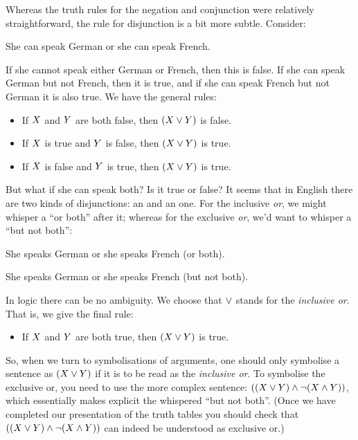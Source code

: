 Whereas the truth rules for the negation and conjunction were relatively straightforward, the rule for disjunction is a bit more subtle.
Consider:
\begin{earg}
\item[\ex{conj}] She can speak German or she can speak French.
\end{earg}
If she cannot speak either German or French, then this is false. If she can speak German but not French, then it is true, and if she can speak French but not German it is also true.
We have the general rules:
\begin{itemize}
\item If $X$ and $Y$ are both false, then $(X\vee Y)$ is false.
\item  If $X$ is true and $Y$ is false, then $(X\vee Y)$ is true.
\item  If $X$ is false and $Y$ is true, then $(X\vee Y)$ is true.
\end{itemize}

But what if she can speak both? Is it true or false?
It seems that in English there are two kinds of disjunctions: an  and an  one. For the inclusive \emph{or}, we might whisper a ``or both'' after it; whereas for the exclusive \emph{or}, we'd want to whisper a ``but not both'':
\begin{earg}
\item [\ex{inclor}] She speaks German or
she speaks French (or both).
\item [\ex{exclor}] She speaks German or
she speaks French (but not both).
\end{earg}

In logic there can be no ambiguity. We choose that $\vee$ stands for the \emph{inclusive or}.
That is, we give the final rule:
\begin{itemize}
\item If $X$ and $Y$ are both true, then $(X\vee Y)$ is true.
\end{itemize}

So, when we turn to symbolisations of arguments, one should only symbolise a sentence as $(X\vee Y)$ if it is to be read as the \emph{inclusive or}. To symbolise the exclusive or, you need to use the more complex sentence: $((X\vee Y)\mathbin{\wedge} \neg(X\mathbin{\wedge}Y))$, which essentially makes explicit the whispered ``but not both''. (Once we have completed our presentation of the truth tables you should check that $((X\vee Y)\mathbin{\wedge} \neg(X\mathbin{\wedge}Y))$ can indeed be understood as exclusive or.)

